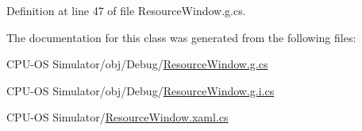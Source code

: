 Definition at line 47 of file Resource\+Window.\+g.\+cs.



The documentation for this class was generated from the following files\+:\begin{DoxyCompactItemize}
\item 
C\+P\+U-\/\+O\+S Simulator/obj/\+Debug/\hyperlink{_resource_window_8g_8cs}{Resource\+Window.\+g.\+cs}\item 
C\+P\+U-\/\+O\+S Simulator/obj/\+Debug/\hyperlink{_resource_window_8g_8i_8cs}{Resource\+Window.\+g.\+i.\+cs}\item 
C\+P\+U-\/\+O\+S Simulator/\hyperlink{_resource_window_8xaml_8cs}{Resource\+Window.\+xaml.\+cs}\end{DoxyCompactItemize}
